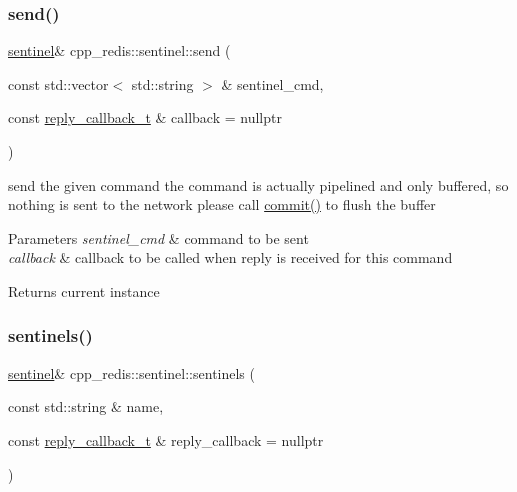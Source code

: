 \mbox{\label{classcpp__redis_1_1sentinel_a0df522dbd7debda4e73f616a62d6f5ee}} 
\subsubsection{\texorpdfstring{send()}{send()}}
{\footnotesize\ttfamily \hyperlink{classcpp__redis_1_1sentinel}{sentinel}\& cpp\+\_\+redis\+::sentinel\+::send (\begin{DoxyParamCaption}\item[{const std\+::vector$<$ std\+::string $>$ \&}]{sentinel\+\_\+cmd,  }\item[{const \hyperlink{classcpp__redis_1_1sentinel_ae1a150ff8787208c47414397a061c9a7}{reply\+\_\+callback\+\_\+t} \&}]{callback = {\ttfamily nullptr} }\end{DoxyParamCaption})}

send the given command the command is actually pipelined and only buffered, so nothing is sent to the network please call \hyperlink{classcpp__redis_1_1sentinel_ad4f85d486499f82225b244f85091b31e}{commit()} to flush the buffer


\begin{DoxyParams}{Parameters}
{\em sentinel\+\_\+cmd} & command to be sent \\
\hline
{\em callback} & callback to be called when reply is received for this command \\
\hline
\end{DoxyParams}
\begin{DoxyReturn}{Returns}
current instance 
\end{DoxyReturn}
\mbox{\label{classcpp__redis_1_1sentinel_a38436712626f27867ecff225eed87a7f}} 
\subsubsection{\texorpdfstring{sentinels()}{sentinels()}}
{\footnotesize\ttfamily \hyperlink{classcpp__redis_1_1sentinel}{sentinel}\& cpp\+\_\+redis\+::sentinel\+::sentinels (\begin{DoxyParamCaption}\item[{const std\+::string \&}]{name,  }\item[{const \hyperlink{classcpp__redis_1_1sentinel_ae1a150ff8787208c47414397a061c9a7}{reply\+\_\+callback\+\_\+t} \&}]{reply\+\_\+callback = {\ttfamily nullptr} }\end{DoxyParamCaption})}

